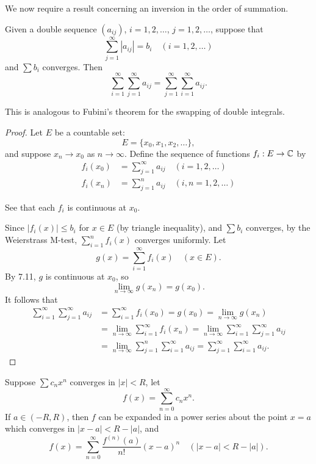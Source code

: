 We now require a result concerning an inversion in the order of summation.

\begin{proposition}
Given a double sequence $(a_{ij})$, $i=1,2,\dots$, $j=1,2,\dots$, suppose that
\[\sum_{j=1}^{\infty}|a_{ij}|=b_i\quad(i=1,2,\dots)\]
and $\sum b_i$ converges. Then
\begin{equation}
\sum_{i=1}^{\infty}\sum_{j=1}^{\infty}a_{ij}=\sum_{j=1}^{\infty}\sum_{i=1}^{\infty}a_{ij}.
\end{equation}
\end{proposition}

\begin{remark}
This is analogous to Fubini's theorem for the swapping of double integrals.
\end{remark}

\begin{proof}
Let $E$ be a countable set:
\[E=\{x_0,x_1,x_2,\dots\},\]
and suppose $x_n\to x_0$ as $n\to\infty$. Define the sequence of functions $f_i:E\to\mathbb C$ by
\begin{align*}
f_i(x_0)&=\sum_{j=1}^{\infty}a_{ij}\quad(i=1,2,\dots)\\
f_i(x_n)&=\sum_{j=1}^{n}a_{ij}\quad(i,n=1,2,\dots)
\end{align*}

See that each $f_i$ is continuous at $x_0$.

Since $|f_i(x)|\le b_i$ for $x\in E$ (by triangle inequality), and $\sum b_i$ converges, by the Weierstrass M-test, $\displaystyle\sum_{i=1}^{n}f_i(x)$ converges uniformly. Let
\[g(x)=\sum_{i=1}^{\infty}f_i(x)\quad(x\in E).\]
By 7.11, $g$ is continuous at $x_0$, so
\[\lim_{n\to\infty}g(x_n)=g(x_0).\]
It follows that 
\begin{align*}
\sum_{i=1}^{\infty}\sum_{j=1}^{\infty}a_{ij}
&=\sum_{i=1}^{\infty}f_i(x_0)=g(x_0)=\lim_{n\to\infty}g(x_n)\\
&=\lim_{n\to\infty}\sum_{i=1}^{\infty}f_i(x_n)=\lim_{n\to\infty}\sum_{i=1}^{\infty}\sum_{j=1}^{\infty}a_{ij}\\
&=\lim_{n\to\infty}\sum_{j=1}^{n}\sum_{i=1}^{\infty}a_{ij}=\sum_{j=1}^{\infty}\sum_{i=1}^{\infty}a_{ij}.
\end{align*}
\end{proof}

\begin{theorem}
Suppose $\sum c_nx^n$ converges in $|x|<R$, let
\[f(x)=\sum_{n=0}^{\infty}c_nx^n.\]
If $a\in(-R,R)$, then $f$ can be expanded in a power series about the point $x=a$ which converges in $|x-a|<R-|a|$, and
\begin{equation}\label{eqn:taylor-theorem-power-series}
f(x)=\sum_{n=0}^{\infty}\frac{f^{(n)}(a)}{n!}(x-a)^n\quad(|x-a|<R-|a|).
\end{equation}
\end{theorem}

